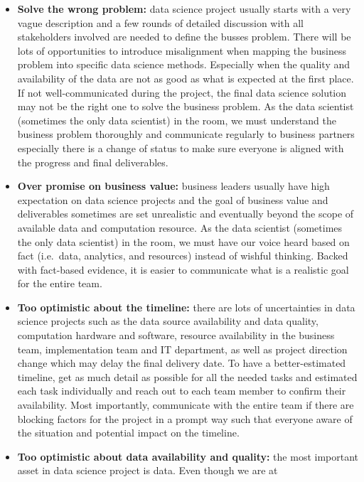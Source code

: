 \documentclass[12pt,]{krantz}
\theoremstyle{definition}
\theoremstyle{definition}
\theoremstyle{remark}
\begin{document}
\begin{itemize}
\item
  \textbf{Solve the wrong problem:} data science project usually starts
  with a very vague description and a few rounds of detailed discussion
  with all stakeholders involved are needed to define the busses
  problem. There will be lots of opportunities to introduce misalignment
  when mapping the business problem into specific data science methods.
  Especially when the quality and availability of the data are not as
  good as what is expected at the first place. If not well-communicated
  during the project, the final data science solution may not be the
  right one to solve the business problem. As the data scientist
  (sometimes the only data scientist) in the room, we must understand
  the business problem thoroughly and communicate regularly to business
  partners especially there is a change of status to make sure everyone
  is aligned with the progress and final deliverables.
\item
  \textbf{Over promise on business value:} business leaders usually have
  high expectation on data science projects and the goal of business
  value and deliverables sometimes are set unrealistic and eventually
  beyond the scope of available data and computation resource. As the
  data scientist (sometimes the only data scientist) in the room, we
  must have our voice heard based on fact (i.e.~data, analytics, and
  resources) instead of wishful thinking. Backed with fact-based
  evidence, it is easier to communicate what is a realistic goal for the
  entire team.
\item
  \textbf{Too optimistic about the timeline:} there are lots of
  uncertainties in data science projects such as the data source
  availability and data quality, computation hardware and software,
  resource availability in the business team, implementation team and IT
  department, as well as project direction change which may delay the
  final delivery date. To have a better-estimated timeline, get as much
  detail as possible for all the needed tasks and estimated each task
  individually and reach out to each team member to confirm their
  availability. Most importantly, communicate with the entire team if
  there are blocking factors for the project in a prompt way such that
  everyone aware of the situation and potential impact on the timeline.
\item
  \textbf{Too optimistic about data availability and quality:} the most
  important asset in data science project is data. Even though we are at

\end{itemize}
\end{document}
